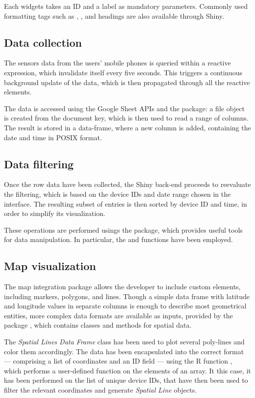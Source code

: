 Each widgets takes an ID and a label as mandatory parameters.
Commonly used formatting tags such as , , and  headings are also available through Shiny.


\subsection{Data collection}
The sensors data from the users' mobile phones is queried within a reactive expression, which invalidate itself every five seconds.
This triggers a continuous background update of the data, which is then propagated through all the reactive elements.

The data is accessed using the Google Sheet APIs and the  package: a file object is created from the document key, which is then used to read a range of columns.
The result is stored in a data-frame, where a new column is added, containing the date and time in POSIX format.


\subsection{Data filtering}
Once the row data have been collected, the Shiny back-end proceeds to reevaluate the filtering, which is based on the device IDs and date range chosen in the interface.
The resulting subset of entries is then sorted by device ID and time, in order to simplify its visualization.

These operations are performed usings the  package, which provides useful tools for data manipulation.
In particular, the  and  functions have been employed.


\subsection{Map visualization}
The map integration package  allows the developer to include custom elements, including markers, polygons, and lines.
Though a simple data frame with latitude and longitude values in separate columns is enough to describe most geometrical entities, more complex data formats are available as inputs, provided by the package , which contains classes and methods for spatial data.

The \emph{Spatial Lines Data Frame} class has been used to plot several poly-lines and color them accordingly.
The data has been encapsulated into the correct format --- comprising a list of coordinates and an ID field --- using the R function , which performs a user-defined function on the elements of an array.
It this case, it has been performed on the list of unique device IDs, that have then been used to filter the relevant coordinates and generate \emph{Spatial Line} objects.

